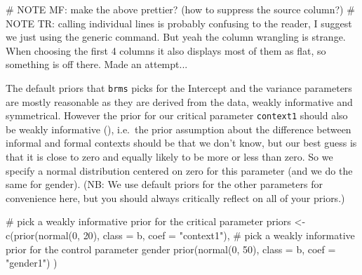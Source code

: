 \documentclass[
  doc,
  floatsintext,
  longtable,
  nolmodern,
  notxfonts,
  notimes,
  colorlinks=true,linkcolor=blue,citecolor=blue,urlcolor=blue]{apa7}
\newenvironment{Shaded}{\begin{snugshade}}{\end{snugshade}}
\newcommand{\AlertTok}[1]{\textcolor[rgb]{0.68,0.00,0.00}{#1}}
\newcommand{\AttributeTok}[1]{\textcolor[rgb]{0.40,0.45,0.13}{#1}}
\newcommand{\CommentTok}[1]{\textcolor[rgb]{0.37,0.37,0.37}{#1}}
\newcommand{\DecValTok}[1]{\textcolor[rgb]{0.68,0.00,0.00}{#1}}
\newcommand{\FunctionTok}[1]{\textcolor[rgb]{0.28,0.35,0.67}{#1}}
\newcommand{\NormalTok}[1]{\textcolor[rgb]{0.00,0.23,0.31}{#1}}
\newcommand{\OtherTok}[1]{\textcolor[rgb]{0.00,0.23,0.31}{#1}}
\newcommand{\StringTok}[1]{\textcolor[rgb]{0.13,0.47,0.30}{#1}}
\begin{document}
\begin{Shaded}
\begin{Highlighting}[]
\CommentTok{\# }\AlertTok{NOTE}\CommentTok{ MF: make the above prettier? (how to suppress the \textasciigrave{}source\textasciigrave{} column?)}
\CommentTok{\# }\AlertTok{NOTE}\CommentTok{ TR: calling individual lines is probably confusing to the reader, I suggest we just using the generic command. But yeah the column wrangling is strange. When choosing the first 4 columns it also displays most of them as flat, so something is off there. Made an attempt...}
\end{Highlighting}
\end{Shaded}

The default priors that \texttt{brms} picks for the Intercept and the
variance parameters are mostly reasonable as they are derived from the
data, weakly informative and symmetrical. However the prior for our
critical parameter \texttt{context1} should also be weakly informative
(), i.e.~the prior assumption about the difference between informal
and formal contexts should be that we don't know, but our best guess is
that it is close to zero and equally likely to be more or less than
zero. So we specify a normal distribution centered on zero for this
parameter (and we do the same for gender). (NB: We use default priors
for the other parameters for convenience here, but you should always
critically reflect on all of your priors.)

\begin{Shaded}
\begin{Highlighting}[]
\CommentTok{\# pick a weakly informative prior for the critical parameter}
\NormalTok{priors }\OtherTok{\textless{}{-}} \FunctionTok{c}\NormalTok{(}\FunctionTok{prior}\NormalTok{(}\FunctionTok{normal}\NormalTok{(}\DecValTok{0}\NormalTok{, }\DecValTok{20}\NormalTok{), }
                  \AttributeTok{class =}\NormalTok{ b, }
                  \AttributeTok{coef =} \StringTok{"context1"}\NormalTok{),}
            \CommentTok{\# pick a weakly informative prior for the control parameter gender}
            \FunctionTok{prior}\NormalTok{(}\FunctionTok{normal}\NormalTok{(}\DecValTok{0}\NormalTok{, }\DecValTok{50}\NormalTok{), }
                  \AttributeTok{class =}\NormalTok{ b, }
                  \AttributeTok{coef =} \StringTok{"gender1"}\NormalTok{)}
\NormalTok{            )}
\end{Highlighting}
\end{Shaded}
\end{document}
